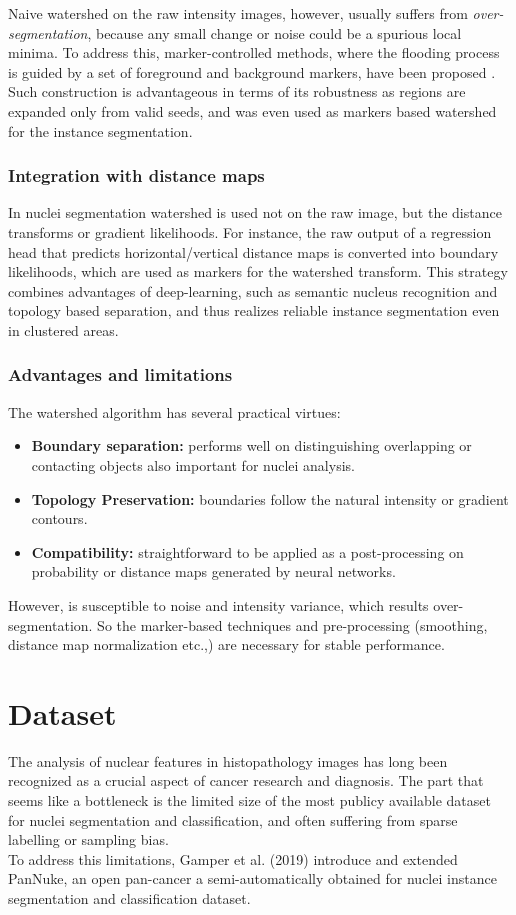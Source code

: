 \documentclass[target=bach,aauheader=,style=]{thud}
\begin{document}
Naive watershed on the raw intensity images, however, usually suffers from \emph{over-segmentation}, because any small change or noise could be a spurious local minima.
To address this, marker-controlled methods, where the flooding process is guided by a set of foreground and background markers, have been proposed \cite{beucher1992watershed}.
Such construction is advantageous in terms of its robustness as regions are expanded only from valid seeds, and was even used as markers based watershed for the instance segmentation.

\subsection{Integration with distance maps}
In nuclei segmentation watershed is used not on the raw image, but the distance transforms or gradient likelihoods.
For instance, the raw output of a regression head that predicts horizontal/vertical distance maps is converted into boundary likelihoods, which are used as markers for the watershed transform.
This strategy combines advantages of deep-learning, such as semantic nucleus recognition and topology based separation, and thus realizes reliable instance segmentation even in clustered areas.

\subsection{Advantages and limitations}
The watershed algorithm has several practical virtues:
\begin{itemize}
\item \textbf{Boundary separation:} performs well on distinguishing overlapping or contacting objects also important for nuclei analysis.
\item \textbf{Topology Preservation:} boundaries follow the natural intensity or gradient contours.
\item \textbf{Compatibility:} straightforward to be applied as a post-processing on probability or distance maps generated by neural networks.
\end{itemize}
However, is susceptible to noise and intensity variance, which results over-segmentation.
So the marker-based techniques and pre-processing (smoothing, distance map normalization etc.,) are necessary for stable performance.
\chapter{Dataset}
\label{sec:dataset}
The analysis of nuclear features in histopathology images has long been recognized as a crucial aspect of cancer research and diagnosis. The part that seems like a bottleneck is the limited size of the most publicy available dataset for nuclei segmentation and classification, and often suffering from sparse labelling or sampling bias.\\
To address this limitations, Gamper et al. (2019) 
\cite{gamper2019pannuke,gamper2020pannuke} introduce and extended PanNuke, an open pan-cancer a semi-automatically obtained for nuclei instance segmentation and classification dataset.
\end{document}
